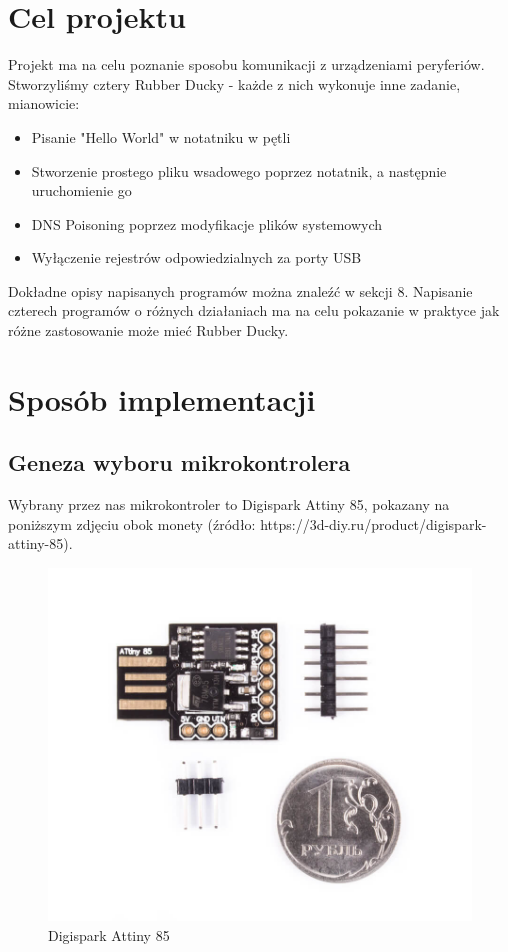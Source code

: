 \documentclass{article}
\begin{document}
\section{Cel projektu}
Projekt ma na celu poznanie sposobu komunikacji z urządzeniami peryferiów. Stworzyliśmy cztery Rubber Ducky - każde z nich wykonuje inne zadanie, mianowicie:
\begin{itemize}
    \item Pisanie "Hello World" w notatniku w pętli
    \item Stworzenie prostego pliku wsadowego poprzez notatnik, a następnie uruchomienie go
    \item DNS Poisoning poprzez modyfikacje plików systemowych
    \item Wyłączenie rejestrów odpowiedzialnych za porty USB
\end{itemize}
Dokładne opisy napisanych programów można znaleźć w sekcji 8. Napisanie czterech programów o różnych działaniach ma na celu pokazanie w praktyce jak różne zastosowanie może mieć Rubber Ducky.

\section{Sposób implementacji}
\subsection{Geneza wyboru mikrokontrolera}
Wybrany przez nas mikrokontroler to Digispark Attiny 85, pokazany na poniższym zdjęciu obok monety (źródło: https://3d-diy.ru/product/digispark-attiny-85).

\begin{figure}[h]
    \centering
    \includegraphics[scale=0.2]{Media/Digispark.jpg}
    \caption{Digispark Attiny 85}
    \label{fig:enter-label}
\end{figure}
\end{document}
